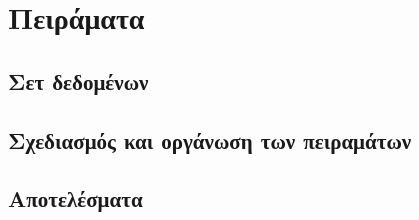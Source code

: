 

\chapter{Πειράματα}

\section{Σετ δεδομένων}

\section{Σχεδιασμός και οργάνωση των πειραμάτων}

\section{Αποτελέσματα}